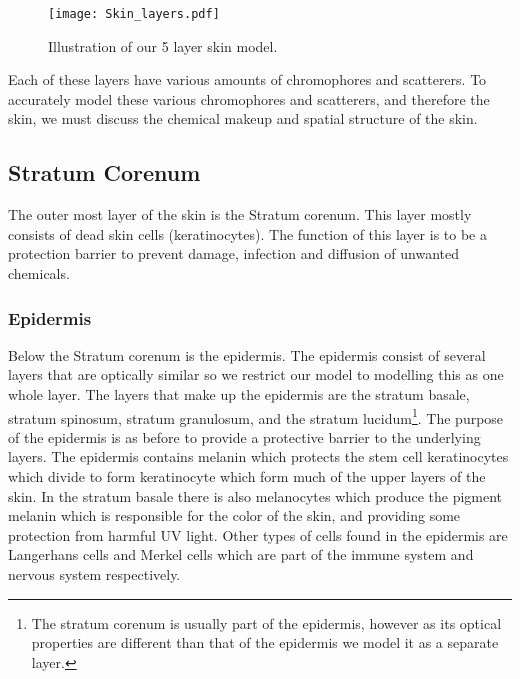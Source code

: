 \begin{figure}[!htpb]
    \centering
    \texttt{[image: Skin\_layers.pdf]}
    \caption{Illustration of our 5 layer skin model.}
    \label{fig:skinexample}
\end{figure}

Each of these layers have various amounts of chromophores and scatterers.
To accurately model these various chromophores and scatterers, and therefore the skin, we must discuss the chemical makeup and spatial structure of the skin.

\subsection*{Stratum Corenum} %
\label{sub:stratum}

The outer most layer of the skin is the Stratum corenum.
This layer mostly consists of dead skin cells (keratinocytes).
The function of this layer is to be a protection barrier to prevent damage, infection and diffusion of unwanted chemicals.


\subsubsection*{Epidermis} %
\label{ssub:epidermis}

Below the Stratum corenum is the epidermis.
The epidermis consist of several layers that are optically similar so we restrict our model to modelling this as one whole layer.
The layers that make up the epidermis are the stratum basale, stratum spinosum, stratum granulosum, and the stratum lucidum\footnote{The stratum corenum is usually part of the epidermis, however as its optical properties are different than that of the epidermis we model it as a separate layer.}.
The purpose of the epidermis is as before to provide a protective barrier to the underlying layers. 
The epidermis contains melanin which protects the stem cell keratinocytes which divide to form keratinocyte which form much of the upper layers of the skin.
In the stratum basale there is also melanocytes which produce the pigment melanin which is responsible for the color of the skin, and providing some protection from harmful UV light. 
Other types of cells found in the epidermis are Langerhans cells and Merkel cells which are part of the immune system and nervous system respectively.


